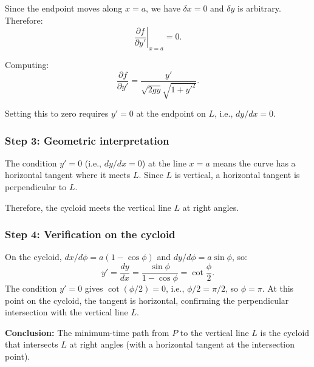 \documentclass[12pt]{article}
\begin{document}
Since the endpoint moves along $x = a$, we have $\delta x = 0$ and $\delta y$ is arbitrary. Therefore:
\[
  \left.\frac{\partial f}{\partial y'}\right|_{x=a} = 0.
\]

Computing:
\[
  \frac{\partial f}{\partial y'} = \frac{y'}{\sqrt{2gy}\sqrt{1+y'^2}}.
\]

Setting this to zero requires $y' = 0$ at the endpoint on $L$, i.e., $dy/dx = 0$.

\subsubsection*{Step 3: Geometric interpretation}

The condition $y' = 0$ (i.e., $dy/dx = 0$) at the line $x = a$ means the curve has a horizontal tangent where it meets $L$. Since $L$ is vertical, a horizontal tangent is perpendicular to $L$.

Therefore, the cycloid meets the vertical line $L$ at right angles.

\subsubsection*{Step 4: Verification on the cycloid}

On the cycloid, $dx/d\phi = a(1-\cos\phi)$ and $dy/d\phi = a\sin\phi$, so:
\[
  y' = \frac{dy}{dx} = \frac{\sin\phi}{1-\cos\phi} = \cot\frac{\phi}{2}.
\]
The condition $y' = 0$ gives $\cot(\phi/2) = 0$, i.e., $\phi/2 = \pi/2$, so $\phi = \pi$. At this point on the cycloid, the tangent is horizontal, confirming the perpendicular intersection with the vertical line $L$.

\medskip
\noindent\textbf{Conclusion:} The minimum-time path from $P$ to the vertical line $L$ is the cycloid that intersects $L$ at right angles (with a horizontal tangent at the intersection point).
\end{document}
